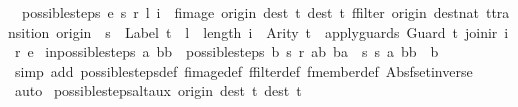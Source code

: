 \begin{isabellebody}
\ \ {\isachardoublequoteopen}possible{\isacharunderscore}steps\ e\ s\ r\ l\ i\ {\isacharequal}\ fimage\ {\isacharparenleft}{\isasymlambda}{\isacharparenleft}{\isacharparenleft}origin{\isacharcomma}\ dest{\isacharparenright}{\isacharcomma}\ t{\isacharparenright}{\isachardot}\ {\isacharparenleft}dest{\isacharcomma}\ t{\isacharparenright}{\isacharparenright}\ {\isacharparenleft}ffilter\ {\isacharparenleft}{\isasymlambda}{\isacharparenleft}{\isacharparenleft}origin{\isacharcomma}\ dest{\isacharcolon}{\isacharcolon}nat{\isacharparenright}{\isacharcomma}\ t{\isacharcolon}{\isacharcolon}transition{\isacharparenright}{\isachardot}\ origin\ {\isacharequal}\ s\ {\isasymand}\ {\isacharparenleft}Label\ t{\isacharparenright}\ {\isacharequal}\ l\ {\isasymand}\ {\isacharparenleft}length\ i{\isacharparenright}\ {\isacharequal}\ {\isacharparenleft}Arity\ t{\isacharparenright}\ {\isasymand}\ apply{\isacharunderscore}guards\ {\isacharparenleft}Guard\ t{\isacharparenright}\ {\isacharparenleft}join{\isacharunderscore}ir\ i\ r{\isacharparenright}{\isacharparenright}\ e{\isacharparenright}{\isachardoublequoteclose}\isanewline
\isanewline
{}\isamarkupfalse%
\ in{\isacharunderscore}possible{\isacharunderscore}steps{\isacharcolon}\ {\isachardoublequoteopen}{\isacharparenleft}a{\isacharcomma}\ bb{\isacharparenright}\ {\isacharbar}{\isasymin}{\isacharbar}\ possible{\isacharunderscore}steps\ b\ s\ r\ ab\ ba\ {\isasymLongrightarrow}\ {\isasymexists}s{\isachardot}\ {\isacharparenleft}{\isacharparenleft}s{\isacharcomma}\ a{\isacharparenright}{\isacharcomma}\ bb{\isacharparenright}\ {\isacharbar}{\isasymin}{\isacharbar}\ b{\isachardoublequoteclose}\isanewline
%
\isadelimproof
\ \ %
\endisadelimproof
%
\isatagproof
{}\isamarkupfalse%
\ {\isacharparenleft}simp\ add{\isacharcolon}\ possible{\isacharunderscore}steps{\isacharunderscore}def\ fimage{\isacharunderscore}def\ ffilter{\isacharunderscore}def\ fmember{\isacharunderscore}def\ Abs{\isacharunderscore}fset{\isacharunderscore}inverse{\isacharparenright}\isanewline
\ \ \isamarkupfalse%
\ auto%
\endisatagproof
{\isafoldproof}%
%
\isadelimproof
\isanewline
%
\endisadelimproof
\isanewline
{}\isamarkupfalse%
\ possible{\isacharunderscore}steps{\isacharunderscore}alt{\isacharunderscore}aux{\isacharcolon}\ {\isachardoublequoteopen}{\isacharparenleft}{\isasymlambda}{\isacharparenleft}{\isacharparenleft}origin{\isacharcomma}\ dest{\isacharparenright}{\isacharcomma}\ t{\isacharparenright}{\isachardot}\ {\isacharparenleft}dest{\isacharcomma}\ t{\isacharparenright}{\isacharparenright}\ {\isacharbar}{\isacharbackquote}{\isacharbar}\isanewline

\end{isabellebody}
